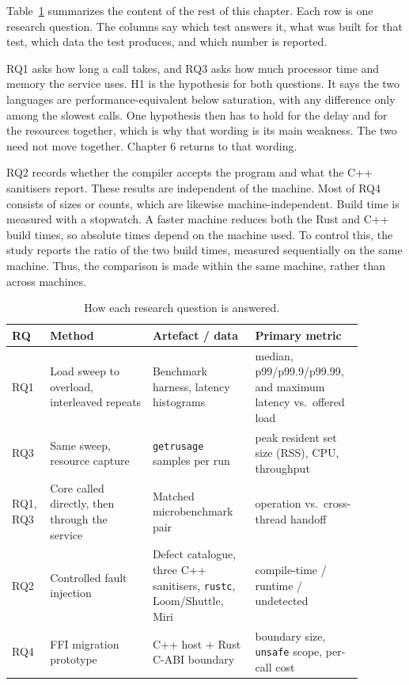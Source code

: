 \documentclass[english,oneside,a4paper,censored,csm,software-track-2020]{HYthesisML}
\begin{document}
Table~\ref{tab:design} summarizes the content of the rest of this chapter. Each row is one research question.
The columns say which test answers it, what was built for that test, which data the test
produces, and which number is reported.

RQ1 asks how long a call takes, and RQ3 asks how much processor time and memory
the service uses. H1 is the hypothesis for
both questions. It says the two languages are performance-equivalent below
saturation, with any difference only among the slowest calls. One hypothesis then has
to hold for the delay and for the resources together, which is why that wording
is its main weakness. The two need not move together. Chapter 6 returns to that wording.

RQ2 records whether the compiler accepts the program and what the C++ sanitisers report. 
These results are independent of the machine. Most of RQ4 consists of sizes or counts, 
which are likewise machine-independent. Build time is measured with a stopwatch. 
A faster machine reduces both the Rust and C++ build times, so absolute times depend 
on the machine used. To control this, the study reports the ratio of the two
build times, measured sequentially on the same machine. 
Thus, the comparison is made within the same machine, rather than across machines.

\begin{table}[ht]
\centering
\small
\caption[How each research question is answered]{How each research question is answered.\label{tab:design}}
\renewcommand{\arraystretch}{1.2}
\setlength{\tabcolsep}{4pt}
\begin{tabular}{@{}p{0.07\linewidth} p{0.27\linewidth} p{0.27\linewidth} p{0.27\linewidth}@{}}
\hline\hline
RQ & Method & Artefact / data & Primary metric \\
\hline
RQ1 & Load sweep to overload, interleaved repeats & Benchmark harness, latency histograms &
median, p99/p99.9/p99.99, and maximum latency vs.\ offered load \\
RQ3 & Same sweep, resource capture & \texttt{getrusage} samples per run &
peak resident set size (RSS), CPU, throughput \\
RQ1, RQ3 & Core called directly, then through the service &
Matched microbenchmark pair &
operation vs.\ cross-thread handoff \\
RQ2 & Controlled fault injection & Defect catalogue, three C++ sanitisers,
\texttt{rustc}, Loom/Shuttle, Miri &
compile-time / runtime / undetected \\
RQ4 & FFI migration prototype & C++ host $+$ Rust C-ABI boundary &
boundary size, \texttt{unsafe} scope, per-call cost \\
\hline
\end{tabular}
\end{table}
\end{document}
